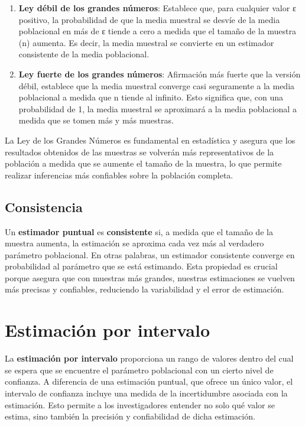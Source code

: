 \documentclass[
  letterpaper,
  DIV=11,
  numbers=noendperiod]{scrreprt}
\begin{document}
\begin{enumerate}
\def\labelenumi{\arabic{enumi}.}
\item
  \textbf{Ley débil de los grandes números}: Establece que, para
  cualquier valor ε positivo, la probabilidad de que la media muestral
  se desvíe de la media poblacional en más de ε tiende a cero a medida
  que el tamaño de la muestra (n) aumenta. Es decir, la media muestral
  se convierte en un estimador consistente de la media poblacional.
\item
  \textbf{Ley fuerte de los grandes números}: Afirmación más fuerte que
  la versión débil, establece que la media muestral converge casi
  seguramente a la media poblacional a medida que n tiende al infinito.
  Esto significa que, con una probabilidad de 1, la media muestral se
  aproximará a la media poblacional a medida que se tomen más y más
  muestras.
\end{enumerate}

La Ley de los Grandes Números es fundamental en estadística y asegura
que los resultados obtenidos de las muestras se volverán más
representativos de la población a medida que se aumente el tamaño de la
muestra, lo que permite realizar inferencias más confiables sobre la
población completa.

\section{Consistencia}\label{consistencia}

Un \textbf{estimador puntual} es \textbf{consistente} si, a medida que
el tamaño de la muestra aumenta, la estimación se aproxima cada vez más
al verdadero parámetro poblacional. En otras palabras, un estimador
consistente converge en probabilidad al parámetro que se está estimando.
Esta propiedad es crucial porque asegura que con muestras más grandes,
nuestras estimaciones se vuelven más precisas y confiables, reduciendo
la variabilidad y el error de estimación.

\chapter{Estimación por intervalo}\label{estimaciuxf3n-por-intervalo}

La \textbf{estimación por intervalo} proporciona un rango de valores
dentro del cual se espera que se encuentre el parámetro poblacional con
un cierto nivel de confianza. A diferencia de una estimación puntual,
que ofrece un único valor, el intervalo de confianza incluye una medida
de la incertidumbre asociada con la estimación. Esto permite a los
investigadores entender no solo qué valor se estima, sino también la
precisión y confiabilidad de dicha estimación.
\end{document}
